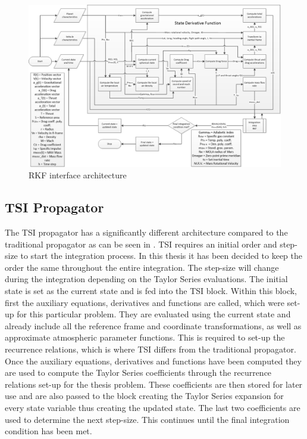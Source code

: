 \begin{figure}[!ht]
\centering
\includegraphics[width=1.5\textwidth, angle = 90]{figures/software/RK_Propagator.png}
\caption{\ac{RKF} interface architecture}
\label{fig:RK_Propagator}
\end{figure}


\subsection{\ac{TSI} Propagator}
\label{subsec:tsipropagator}
The \ac{TSI} propagator has a significantly different architecture compared to the traditional propagator as can be seen in . \ac{TSI} requires an initial order and step-size to start the integration process. In this thesis it has been decided to keep the order the same throughout the entire integration. The step-size will change during the integration depending on the Taylor Series evaluations. The initial state is set as the current state and is fed into the \ac{TSI} block. Within this block, first the auxiliary equations, derivatives and functions are called, which were set-up for this particular problem. They are evaluated using the current state and already include all the reference frame and coordinate transformations, as well as approximate atmospheric parameter functions. This is required to set-up the recurrence relations, which is where \ac{TSI} differs from the traditional propagator. Once the auxiliary equations, derivatives and functions have been computed they are used to compute the Taylor Series coefficients through the recurrence relations set-up for the thesis problem. These coefficients are then stored for later use and are also passed to the block creating the Taylor Series expansion for every state variable thus creating the updated state. The last two coefficients are used to determine the next step-size. This continues until the final integration condition has been met. 


